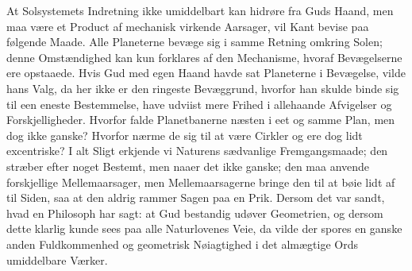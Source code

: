 \documentclass[12pt,a4paper]{book}
\begin{document}
At Solsystemets Indretning ikke umiddelbart kan hidrøre fra Guds Haand, men maa
være et Product af mechanisk virkende Aarsager, vil Kant bevise paa følgende
Maade. Alle Planeterne bevæge sig i samme Retning omkring Solen;
denne Omstændighed kan kun forklares af den Mechanisme, hvoraf Bevægelserne ere
opstaaede. Hvis Gud med egen Haand havde sat Planeterne i Bevægelse, vilde hans
Valg, da her ikke er den ringeste Bevæggrund, hvorfor han skulde binde sig til
een eneste Bestemmelse, have udviist mere Frihed i allehaande Afvigelser og
Forskjelligheder. Hvorfor falde Planetbanerne næsten i eet og samme Plan, men
dog ikke ganske? Hvorfor nærme de sig til at være Cirkler og ere dog lidt
excentriske? I alt Sligt erkjende vi Naturens sædvanlige Fremgangsmaade; den
stræber efter noget Bestemt, men naaer det ikke ganske; den maa anvende
forskjellige Mellemaarsager, men Mellemaarsagerne bringe den til at bøie lidt
af til Siden, saa at den aldrig rammer Sagen paa en Prik. Dersom det var sandt,
hvad en Philosoph har sagt: at Gud bestandig udøver Geometrien, og dersom dette
klarlig kunde sees paa alle Naturlovenes Veie, da vilde der spores en ganske
anden Fuldkommenhed og geometrisk Nøiagtighed i det almægtige Ords umiddelbare
Værker.
\end{document}
